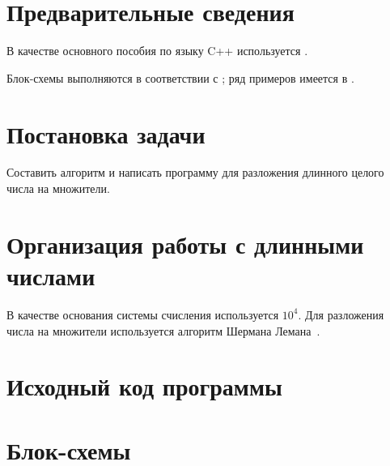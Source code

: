 \documentclass[a4paper,12pt]{article} %
\begin{document}
\setcounter{page}{2}

\section*{Предварительные сведения}

В качестве основного пособия по языку C++ используется \cite{chmyhalo}.


Блок-схемы выполняются в соответствии с \cite{gost-block-scheme};
ряд примеров имеется в \cite{wiki-block-scheme}.


\section*{Постановка задачи}
Составить алгоритм и написать программу
для разложения длинного целого числа на множители.

\section*{Организация работы с длинными числами}
В качестве основания системы счисления используется $10^4$.
Для разложения числа на множители используется алгоритм Шермана Лемана~\cite{wiki-Leman}.


\section*{Исходный код программы}






\section*{Блок-схемы}
\end{document}
